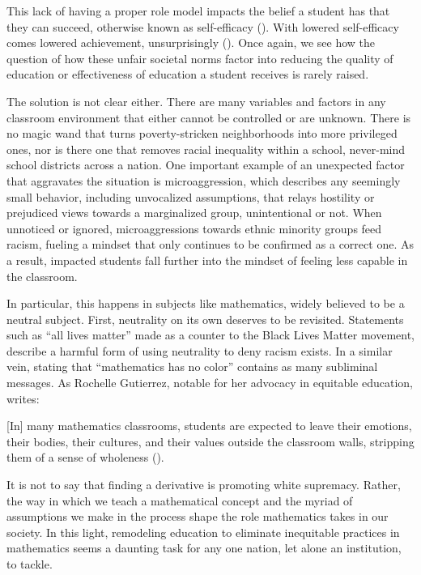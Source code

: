 This lack of having a proper role model impacts the belief a student has that they can succeed, otherwise known as self-efficacy (\cite{thevenin_mentors_2007}). With lowered self-efficacy comes lowered achievement, unsurprisingly (\cite{motlagh_relationship_2011}). Once again, we see how the question of how these unfair societal norms factor into reducing the quality of education or effectiveness of education a student receives is rarely raised.

The solution is not clear either. There are many variables and factors in any classroom environment that either cannot be controlled or are unknown. There is no magic wand that turns poverty-stricken neighborhoods into more privileged ones, nor is there one that removes racial inequality within a school, never-mind school districts across a nation. One important example of an unexpected factor that aggravates the situation is microaggression, which describes any seemingly small behavior, including unvocalized assumptions, that relays hostility or prejudiced views towards a marginalized group, unintentional or not. When unnoticed or ignored, microaggressions towards ethnic minority groups feed racism, fueling a mindset that only continues to be confirmed as a correct one. As a result, impacted students fall further into the mindset of feeling less capable in the classroom.

In particular, this happens in subjects like mathematics, widely believed to be a neutral subject. First, neutrality on its own deserves to be revisited. Statements such as ``all lives matter'' made as a counter to the Black Lives Matter movement, describe a harmful form of using neutrality to deny racism exists. In a similar vein, stating that ``mathematics has no color'' contains as many subliminal messages. As Rochelle Gutierrez, notable for her advocacy in equitable education, writes:
\begin{displayquote}
  {[In]} many mathematics classrooms, students are expected to leave their emotions, their bodies, their cultures, and their values outside the classroom walls, stripping them of a sense of wholeness (\cite{gutierrez_embracing_2012}).
\end{displayquote}
It is not to say that finding a derivative is promoting white supremacy. Rather, the way in which we teach a mathematical concept and the myriad of assumptions we make in the process shape the role mathematics takes in our society. In this light, remodeling education to eliminate inequitable practices in mathematics seems a daunting task for any one nation, let alone an institution, to tackle.

